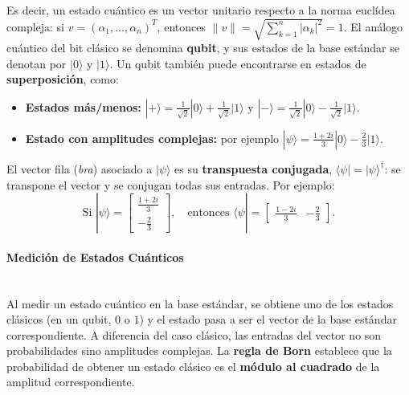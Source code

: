 \documentclass[12pt, a4paper]{article}
\begin{document}
Es decir, un estado cuántico es un vector unitario respecto a la norma euclídea compleja: si $v = (\alpha_1, \dots, \alpha_n)^T$, entonces $\|v\| = \sqrt{\sum_{k=1}^n |\alpha_k|^2} = 1$. El análogo cuántico del bit clásico se denomina \textbf{qubit}, y sus estados de la base estándar se denotan por $|0\rangle$ y $|1\rangle$. Un qubit también puede encontrarse en estados de \textbf{superposición}, como:
\begin{itemize}
    \item \textbf{Estados más/menos:} $|+\rangle = \frac{1}{\sqrt{2}}|0\rangle + \frac{1}{\sqrt{2}}|1\rangle$ \quad y \quad $|-\rangle = \frac{1}{\sqrt{2}}|0\rangle - \frac{1}{\sqrt{2}}|1\rangle$.
    \item \textbf{Estado con amplitudes complejas:} por ejemplo $|\psi\rangle = \frac{1+2i}{3}|0\rangle - \frac{2}{3}|1\rangle$.
\end{itemize}

El vector fila (\textit{bra}) asociado a $|\psi\rangle$ es su \textbf{transpuesta conjugada}, $\langle\psi| = |\psi\rangle^\dagger$: se transpone el vector y se conjugan todas sus entradas. Por ejemplo:
\[ \text{Si } |\psi\rangle = \begin{bmatrix} \frac{1+2i}{3} \\ -\frac{2}{3} \end{bmatrix}, \quad \text{entonces } \langle \psi | = \begin{bmatrix} \frac{1-2i}{3} & -\frac{2}{3} \end{bmatrix}. \]

\paragraph{Medición de Estados Cuánticos}\mbox{}\\

\noindent Al medir un estado cuántico en la base estándar, se obtiene uno de los estados clásicos (en un qubit, $0$ o $1$) y el estado pasa a ser el vector de la base estándar correspondiente. A diferencia del caso clásico, las entradas del vector no son probabilidades sino amplitudes complejas. La \textbf{regla de Born} establece que la probabilidad de obtener un estado clásico es el \textbf{módulo al cuadrado} de la amplitud correspondiente.
\end{document}
